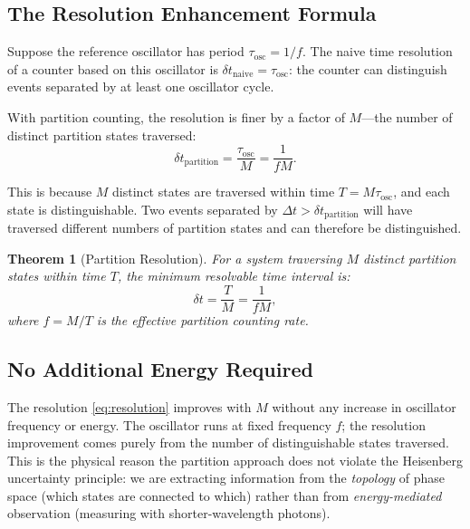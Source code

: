 \documentclass[twocolumn,10pt]{article}
\newtheorem{theorem}{Theorem}[section]
\begin{document}
\subsection{The Resolution Enhancement Formula}

Suppose the reference oscillator has period $\tau_{\mathrm{osc}} = 1/f$. The naive time resolution of a counter based on this oscillator is $\delta t_{\mathrm{naive}} = \tau_{\mathrm{osc}}$: the counter can distinguish events separated by at least one oscillator cycle.

With partition counting, the resolution is finer by a factor of $M$---the number of distinct partition states traversed:
\begin{equation}
    \delta t_{\mathrm{partition}} = \frac{\tau_{\mathrm{osc}}}{M} = \frac{1}{fM}.
    \label{eq:resolution}
\end{equation}

This is because $M$ distinct states are traversed within time $T = M\tau_{\mathrm{osc}}$, and each state is distinguishable. Two events separated by $\Delta t > \delta t_{\mathrm{partition}}$ will have traversed different numbers of partition states and can therefore be distinguished.

\begin{theorem}[Partition Resolution]
\label{thm:resolution}
For a system traversing $M$ distinct partition states within time $T$, the minimum resolvable time interval is:
\begin{equation}
    \delta t = \frac{T}{M} = \frac{1}{fM},
\end{equation}
where $f = M/T$ is the effective partition counting rate.
\end{theorem}

\subsection{No Additional Energy Required}

The resolution \eqref{eq:resolution} improves with $M$ without any increase in oscillator frequency or energy. The oscillator runs at fixed frequency $f$; the resolution improvement comes purely from the number of distinguishable states traversed. This is the physical reason the partition approach does not violate the Heisenberg uncertainty principle: we are extracting information from the \emph{topology} of phase space (which states are connected to which) rather than from \emph{energy-mediated} observation (measuring with shorter-wavelength photons).
\end{document}
